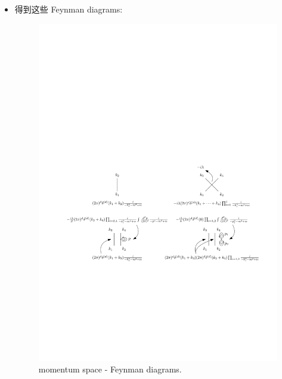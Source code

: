 \begin{itemize}
	\item 得到这些 Feynman diagrams:
	
	\begin{figure}[H]
		\centering
		\includegraphics[scale=1]{figures/collision between particles - Feynman diagrams (in momentum space).pdf}
		\caption{momentum space - Feynman diagrams.}
		\label{figure 3.3}
	\end{figure}
	

\end{itemize}
